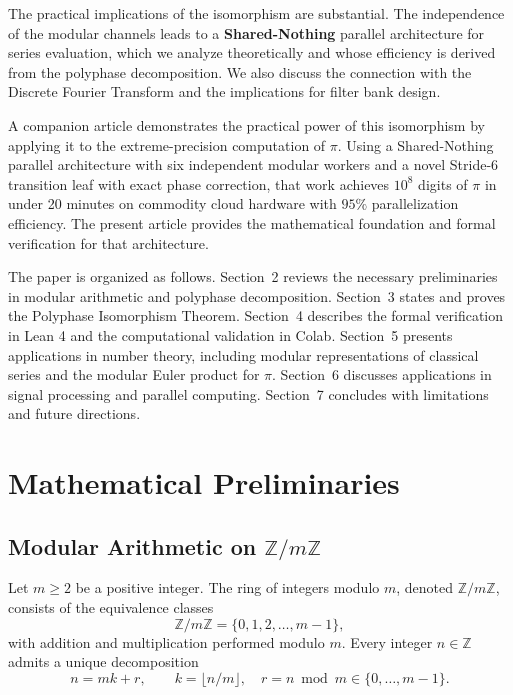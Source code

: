 \documentclass{mcom-l} %
\theoremstyle{plain} %
\theoremstyle{definition} %
\theoremstyle{remark} %
\begin{document}
The practical implications of the isomorphism are substantial. The independence of the modular channels leads to a \textbf{Shared-Nothing} parallel architecture for series evaluation, which we analyze theoretically and whose efficiency is derived from the polyphase decomposition. We also discuss the connection with the Discrete Fourier Transform and the implications for filter bank design.

A companion article \cite{peinador_modular} demonstrates the practical power of this isomorphism by applying it to the extreme-precision computation of \(\pi\). Using a Shared-Nothing parallel architecture with six independent modular workers and a novel Stride-6 transition leaf with exact phase correction, that work achieves \(10^8\) digits of \(\pi\) in under 20 minutes on commodity cloud hardware with \(95\%\) parallelization efficiency. The present article provides the mathematical foundation and formal verification for that architecture.

The paper is organized as follows. Section~2 reviews the necessary preliminaries in modular arithmetic and polyphase decomposition. Section~3 states and proves the Polyphase Isomorphism Theorem. Section~4 describes the formal verification in Lean 4 and the computational validation in Colab. Section~5 presents applications in number theory, including modular representations of classical series and the modular Euler product for \(\pi\). Section~6 discusses applications in signal processing and parallel computing. Section~7 concludes with limitations and future directions.

\section{Mathematical Preliminaries}
\label{sec:prelim}

\subsection{Modular Arithmetic on \(\mathbb{Z}/m\mathbb{Z}\)}
Let \(m \ge 2\) be a positive integer. The ring of integers modulo \(m\), denoted \(\mathbb{Z}/m\mathbb{Z}\), consists of the equivalence classes
\begin{equation}
\mathbb{Z}/m\mathbb{Z} = \{0, 1, 2, \dots, m-1\},
\end{equation}
with addition and multiplication performed modulo \(m\). Every integer \(n \in \mathbb{Z}\) admits a unique decomposition
\begin{equation}
n = m k + r, \qquad k = \lfloor n/m \rfloor, \quad r = n \bmod m \in \{0, \dots, m-1\}.
\label{eq:divalg}
\end{equation}
\end{document}
